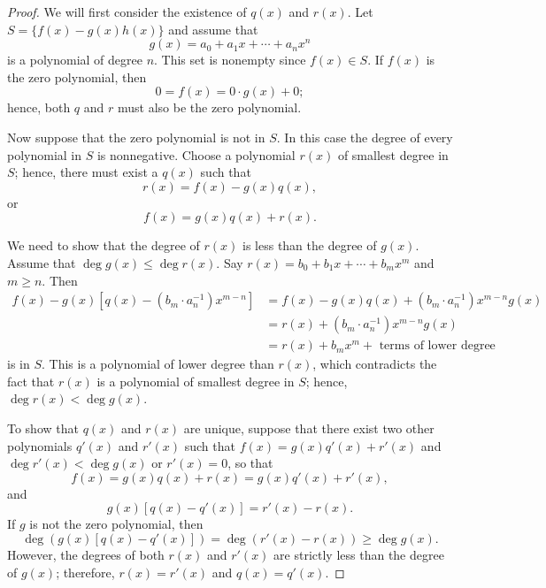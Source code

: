 \begin{proof}
We will first consider the existence of $q(x)$ and $r(x)$. Let $S = \{
f(x) - g(x) h(x) \}$ and assume that 
\[
g(x) = a_0 + a_1 x + \cdots + a_n x^n
\]
is a polynomial of degree $n$. This set is nonempty since $f(x) \in
S$. If $f(x)$ is the zero polynomial, then 
\[
0 = f(x) = 0 \cdot g(x) + 0;
\]
hence, both $q$ and $r$ must also be the zero polynomial. 
 
 
Now suppose that the zero polynomial is not in $S$. In this case the
degree of every polynomial in $S$ is nonnegative.  Choose a polynomial
$r(x)$ of smallest degree in $S$; hence, there must exist a $q(x)$ such that  
\[
r(x) = f(x) - g(x) q(x),
\]
or 
\[
f(x) = g(x ) q(x) + r(x).
\]


We need to show that the degree of $r(x)$ is less than the degree of
$g(x)$. Assume that $\deg g(x) \leq \deg r(x)$. Say $r(x) = b_0 + b_1 
x + \cdots + b_m x^m$ and $m \geq n$. Then
\begin{align*}
f(x) - g(x) [ q(x) - (b_m\cdot a_n^{-1}) x^{m-n} ]
& = f(x) - g(x) q(x) 
    +  (b_m\cdot a_n^{-1}) x^{m-n} g(x)  \\
& = r(x) + (b_m\cdot a_n^{-1}) x^{m-n} g(x) \\
& = r(x) + b_m x^m    + \mbox{ terms of lower degree}
\end{align*}
is in $S$. This is a polynomial of lower degree than $r(x)$, which
contradicts the fact that $r(x)$ is a polynomial of smallest degree
in $S$; hence, $\deg r(x) < \deg g(x)$.
 
To show that  $q(x)$ and $r(x)$ are unique, suppose that there exist
two other polynomials $q'(x)$ and $r'(x)$ such that $f(x) = g(x) q'(x)
+ r'(x)$ and $\deg r'(x) < \deg g(x)$ or $r'(x) = 0$, so that
\[
f(x) = g(x) q(x) + r(x) = g(x) q'(x) + r'(x),
\]
and
\[
g(x) [q(x) - q'(x) ] = r'(x) - r(x).
\]
If $g$ is not the zero polynomial, then 
\[
\deg( g(x) [q(x) - q'(x) ] )= \deg( r'(x) - r(x) ) \geq \deg g(x).
\]
However, the degrees of both $r(x)$ and $r'(x)$ are strictly less than
the degree of $g(x)$; therefore, $r(x) = r'(x)$ and $q(x) = q'(x)$.
\end{proof}
 
